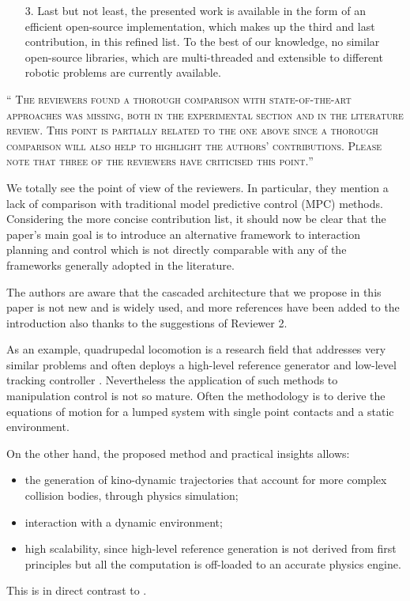 \documentclass[10pt]{article}
\newcommand{\referee}[1]{\;
  \begin{minipage}[t]{.95\textwidth}
    ``{\small\color{red} \textsc{#1}}''
  \end{minipage}\medskip
  }
\begin{document}
\begin{enumerate}[label={[E:\,\arabic{enumi}]}]
\begin{enumerate}
\item[3.] Last but not least, the presented work is available in the form of an efficient open-source implementation, which makes up the third and last contribution, in this refined list. To the best of our knowledge, no similar open-source libraries, which are multi-threaded and extensible to different robotic problems are currently available.  
\end{enumerate}


\item\label{reply:E1:3} \label{reply:ext:comparison} \referee{The reviewers found a thorough comparison with state-of-the-art approaches was missing, both in the experimental section and in the literature review. This point is partially related to the one above since a thorough comparison will also help to highlight the authors’ contributions. Please note that three of the reviewers have criticised this point.}


We totally see the point of view of the reviewers. In particular, they mention a lack of comparison with traditional model predictive control (MPC) methods. Considering the more concise contribution list, it should now be clear that the paper’s main goal is to introduce an alternative framework to interaction planning and control which is not directly comparable with any of the frameworks generally adopted in the literature. 

The authors are aware that the cascaded architecture that we propose in this paper is not new and is widely used, and more references have been added to the introduction also thanks to the suggestions of Reviewer 2. 

As an example, quadrupedal locomotion is a research field that addresses very similar problems and often deploys a high-level reference generator and low-level tracking controller \cite{bjelonic2019keep}. Nevertheless the application of such methods to manipulation control is not so mature. Often the methodology is to derive the equations of motion for a lumped system with single point contacts and a static environment. 

On the other hand, the proposed method and practical insights allows:
\begin{itemize}
    \item the generation of kino-dynamic trajectories that account for more complex collision bodies, through physics simulation;
    \item interaction with a dynamic environment;
    \item high scalability, since high-level reference generation is not derived from first principles but all the computation is off-loaded to an accurate physics engine.
\end{itemize}
This is in direct contrast to \cite{minniti2021model, bjelonic2019keep}. 


\end{enumerate}
\end{document}
